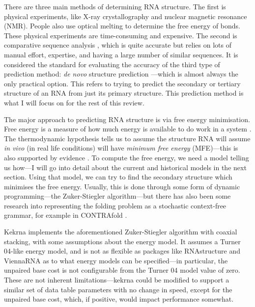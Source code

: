\documentclass{cshonours}
\begin{document}
There are three main methods of determining RNA structure. The first is physical experiments, like X-ray crystallography and nuclear magnetic resonance (NMR). People also use optical melting to determine the free energy of bonds. These physical experiments are time-consuming and expensive. The second is comparative sequence analysis \cite{comparative}, which is quite accurate but relies on lots of manual effort, expertise, and having a large number of similar sequences. It is considered the standard for evaluating the accuracy of the third type of prediction method: \emph{de novo} structure prediction \cite{tPartition}---which is almost always the only practical option. This refers to trying to predict the secondary or tertiary structure of an RNA from just its primary structure. This prediction method is what I will focus on for the rest of this review.

The major approach to predicting RNA structure is via free energy minimisation. Free energy is a measure of how much energy is available to do work in a system \cite{perrotThermodynamics}. The thermodynamic hypothesis \cite{anfinsenThermodynamicHypothesis} tells us to assume the structure RNA will assume \emph{in vivo} (in real life conditions) will have \emph{minimum free energy} (MFE)---this is also supported by evidence \cite{tinocoHowRnaFolds}. To compute the free energy, we need a model telling us how---I will go into detail about the current and historical models in the next section. Using that model, we can try to find the secondary structure which minimises the free energy. Usually, this is done through some form of dynamic programming---the Zuker-Stiegler algorithm---but there has also been some research into representing the folding problem as a stochastic context-free grammar, for example in CONTRAfold \cite{doContrafold}.

Kekrna implements the aforementioned Zuker-Stiegler algorithm with coaxial stacking, with some assumptions about the energy model. It assumes a Turner 04-like energy model, and is not as flexible as packages like RNAstructure \cite{rnastructure} and ViennaRNA \cite{viennarna} as to what energy models can be specified---in particular, the unpaired base cost is not configurable from the Turner 04 model value of zero. These are not inherent limitations---kekrna could be modified to support a similar set of data table parameters with no change in speed, except for the unpaired base cost, which, if positive, would impact performance somewhat.
\end{document}
